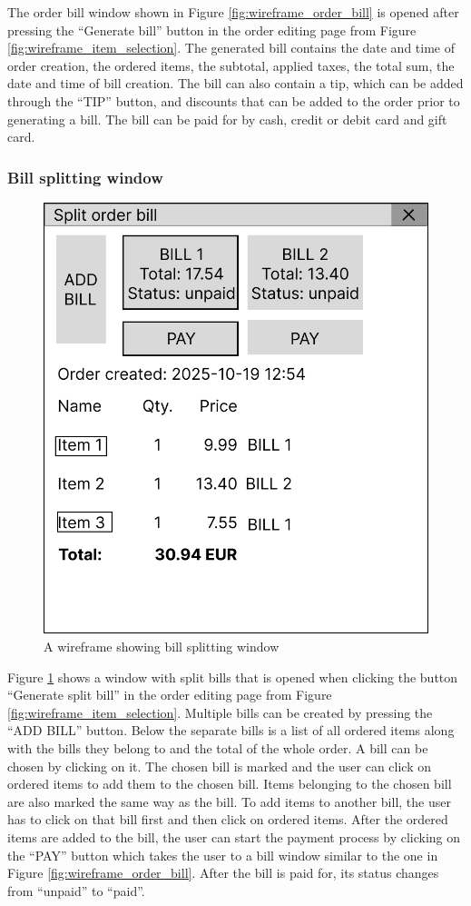 \documentclass[11pt,a4paper,pdftex]{article}
\begin{document}
The order bill window shown in Figure \ref{fig:wireframe_order_bill} is opened after pressing the \enquote{Generate bill} button in the order editing page from Figure \ref{fig:wireframe_item_selection}. The generated bill contains the date and time of order creation, the ordered items, the subtotal, applied taxes, the total sum, the date and time of bill creation. The bill can also contain a tip, which can be added through the \enquote{TIP} button, and discounts that can be added to the order prior to generating a bill. The bill can be paid for by cash, credit or debit card and gift card.

\subsubsection{Bill splitting window}

\begin{figure}[H]
    \centering
    \includegraphics[width=0.5\linewidth]{wireframes/SplitOrderBill.png}
    \caption{A wireframe showing bill splitting window}
    \label{fig:wireframe_split_bill}
\end{figure}

Figure \ref{fig:wireframe_split_bill} shows a window with split bills that is opened when clicking the button \enquote{Generate split bill} in the order editing page from Figure \ref{fig:wireframe_item_selection}. Multiple bills can be created by pressing the \enquote{ADD BILL} button. Below the separate bills is a list of all ordered items along with the bills they belong to and the total of the whole order. A bill can be chosen by clicking on it. The chosen bill is marked and the user can click on ordered items to add them to the chosen bill. Items belonging to the chosen bill are also marked the same way as the bill. To add items to another bill, the user has to click on that bill first and then click on ordered items. After the ordered items are added to the bill, the user can start the payment process by clicking on the \enquote{PAY} button which takes the user to a bill window similar to the one in Figure \ref{fig:wireframe_order_bill}. After the bill is paid for, its status changes from \enquote{unpaid} to \enquote{paid}.
\end{document}
